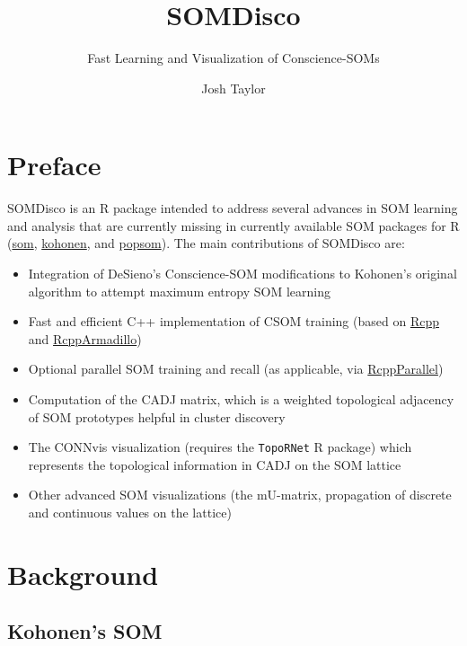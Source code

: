 \documentclass[]{article}
\title{SOMDisco}
\subtitle{Fast Learning and Visualization of Conscience-SOMs}
\author{Josh Taylor}
\date{}
\providecommand{\tightlist}{%
  \setlength{\itemsep}{0pt}\setlength{\parskip}{0pt}}
\begin{document}
\maketitle

{
\setcounter{tocdepth}{2}
\tableofcontents
}
\hypertarget{preface}{%
\section*{Preface}\label{preface}}

SOMDisco is an R package intended to address several advances in SOM learning and analysis that are currently missing in currently available SOM packages for R (\href{https://cran.r-project.org/web/packages/som/}{som}, \href{https://cran.r-project.org/web/packages/kohonen/}{kohonen}, and \href{https://cran.r-project.org/web/packages/popsom/index.html}{popsom}). The main contributions of SOMDisco are:

\begin{itemize}
\tightlist
\item
  Integration of DeSieno's Conscience-SOM modifications to Kohonen's original algorithm to attempt maximum entropy SOM learning
\item
  Fast and efficient C++ implementation of CSOM training (based on \href{https://cran.r-project.org/web/packages/Rcpp/index.html}{Rcpp} and \href{https://cran.r-project.org/web/packages/RcppArmadillo/index.html}{RcppArmadillo})
\item
  Optional parallel SOM training and recall (as applicable, via \href{https://cran.r-project.org/web/packages/RcppParallel/index.html}{RcppParallel})
\item
  Computation of the CADJ matrix, which is a weighted topological adjacency of SOM prototypes helpful in cluster discovery
\item
  The CONNvis visualization (requires the \texttt{TopoRNet} R package) which represents the topological information in CADJ on the SOM lattice
\item
  Other advanced SOM visualizations (the mU-matrix, propagation of discrete and continuous values on the lattice)
\end{itemize}

\hypertarget{background}{%
\section{Background}\label{background}}

\hypertarget{kohonens-som}{%
\subsection{Kohonen's SOM}\label{kohonens-som}}
\end{document}
